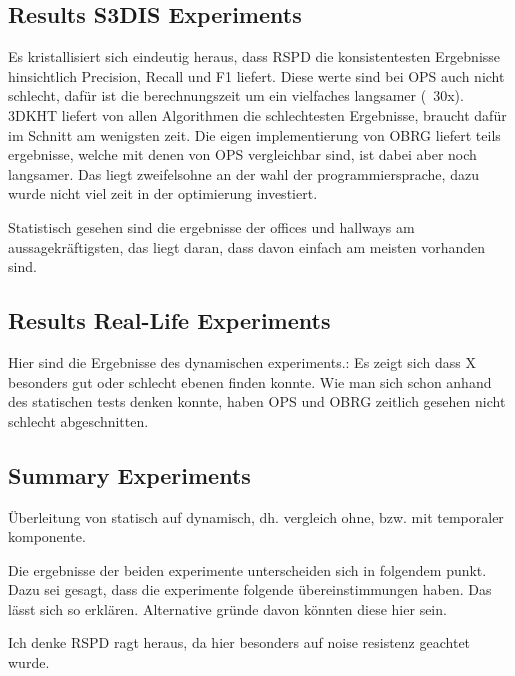 \documentclass[main.tex]{subfiles}
\begin{document}
\subsection*{Results S3DIS Experiments}
Es kristallisiert sich eindeutig heraus, dass RSPD die konsistentesten Ergebnisse hinsichtlich
Precision, Recall und F1 liefert. Diese werte sind bei OPS auch nicht schlecht, dafür ist die
berechnungszeit um ein vielfaches langsamer (~30x). 3DKHT liefert von allen Algorithmen die schlechtesten
Ergebnisse, braucht dafür im Schnitt am wenigsten zeit. Die eigen implementierung von OBRG liefert teils ergebnisse,
welche mit denen von OPS vergleichbar sind, ist dabei aber noch langsamer. Das liegt zweifelsohne an der wahl der
programmiersprache, dazu wurde nicht viel zeit in der optimierung investiert.

Statistisch gesehen sind die ergebnisse der offices und hallways am aussagekräftigsten, das liegt daran, dass davon einfach am meisten vorhanden sind.



\subsection{Results Real-Life Experiments}

Hier sind die Ergebnisse des dynamischen experiments.:
Es zeigt sich dass X besonders gut oder schlecht ebenen finden konnte. Wie man sich schon anhand des statischen tests denken konnte, haben OPS und OBRG zeitlich
gesehen nicht schlecht abgeschnitten.

\subsection*{Summary Experiments}
Überleitung von statisch auf dynamisch, dh. vergleich ohne, bzw. mit temporaler komponente.

Die ergebnisse der beiden experimente unterscheiden sich in folgendem punkt. Dazu sei gesagt, dass die experimente folgende übereinstimmungen haben.
Das lässt sich so erklären. Alternative gründe davon könnten diese hier sein.

Ich denke RSPD ragt heraus, da hier besonders auf noise resistenz geachtet wurde. %
\end{document}
